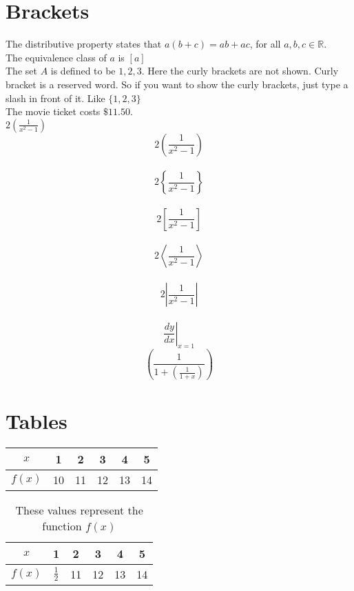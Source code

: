 \documentclass[11pt]{article}
\begin{document}
\section{Brackets}

The distributive property states that $ a(b+c) = ab + ac$, for all $a, b, c \in \mathbb{R} $.\\[6pt]
The equivalence class of $a$ is $[a]$\\[6pt]
The set $A$ is defined to be ${1,2,3}$. Here the curly brackets are not shown. Curly bracket is a reserved word. So if you want to show the curly brackets, just type a slash in front of it. Like $\{1,2,3\}$\\[6pt]
The movie ticket costs $\$11.50$. 
\\[6pt]
$2(\frac{1}{x^2-1})$\\[6pt]
$$2\left(\frac{1}{x^2-1}\right)$$\\[6pt]
$$2\left\{\frac{1}{x^2-1}\right\}$$\\[6pt]
$$2\left[\frac{1}{x^2-1}\right]$$\\[6pt]
$$2\left \langle   \frac{1}{x^2-1}    \right \rangle    $$\\[6pt]
$$2\left |   \frac{1}{x^2-1}    \right |    $$\\[6pt]
$$ \left. \frac{dy}{dx} \right| _{x=1}  $$
$$ \left(   \frac{1} { 1 + \left( \frac{1}{1+x}  \right) }  \right)   $$

\section{Tables}


\begin{tabular}{|c||c|c|c|c|c|}
\hline
$x$ & 1 & 2 & 3 & 4 & 5 \\ \hline
$f(x)$ & 10 & 11 & 12 & 13 & 14 \\ \hline
\end{tabular}

\vspace{1cm}




\begin{table} [H]
\def\arraystretch {1.5}
\centering

\begin{tabular}{|c||c|c|c|c|c|}
\hline
$x$ & 1 & 2 & 3 & 4 & 5 \\ \hline
$f(x)$ & $\frac{1}{2}$ & 11 & 12 & 13 & 14 \\ \hline
\end{tabular}

\caption{These values represent the function $f(x)$}
\end{table}
\end{document}
